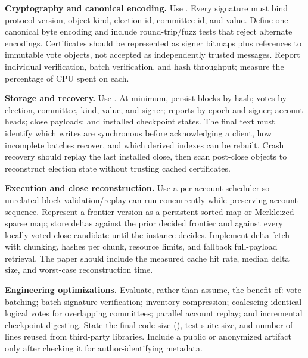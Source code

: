 \documentclass[sigplan,review,anonymous]{acmart}
\newcommand{\paragraphhead}[1]{\smallskip\noindent\textbf{#1}}
\begin{document}
\paragraphhead{Cryptography and canonical encoding.}
Use \ImplCrypto.  Every signature must bind protocol version, object kind, election id, committee id, and value.  Define one canonical byte encoding and include round-trip/fuzz tests that reject alternate encodings.  Certificates should be represented as signer bitmaps plus references to immutable vote objects, not accepted as independently trusted messages.  Report individual verification, batch verification, and hash throughput; measure the percentage of CPU spent on each.

\paragraphhead{Storage and recovery.}
Use \ImplStorage. At minimum, persist blocks by hash; votes by election, committee, kind, value, and signer; reports by epoch and signer; account heads; close payloads; and installed checkpoint states.  The final text must identify which writes are synchronous before acknowledging a client, how incomplete batches recover, and which derived indexes can be rebuilt.  Crash recovery should replay the last installed close, then scan post-close objects to reconstruct election state without trusting cached certificates.

\paragraphhead{Execution and close reconstruction.}
Use a per-account scheduler so unrelated block validation/replay can run concurrently while preserving account sequence.  Represent a frontier version as a persistent sorted map or Merkleized sparse map; store deltas against the prior decided frontier and against every locally voted close candidate until the instance decides.  Implement delta fetch with chunking, hashes per chunk, resource limits, and fallback full-payload retrieval.  The paper should include the measured cache hit rate, median delta size, and worst-case reconstruction time.

\paragraphhead{Engineering optimizations.}
Evaluate, rather than assume, the benefit of: vote batching; batch signature verification; inventory compression; coalescing identical logical votes for overlapping committees; parallel account replay; and incremental checkpoint digesting.  State the final code size (\ImplLOC), test-suite size, and number of lines reused from third-party libraries.  Include a public or anonymized artifact only after checking it for author-identifying metadata.
\end{document}
